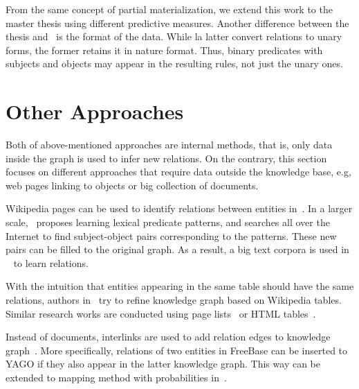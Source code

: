 From the same concept of partial materialization, we extend this work to the master thesis using different predictive measures. Another difference between the thesis and~\cite{ref12} is the format of the data. While la latter convert relations to unary forms, the former retains it in nature format. Thus, binary predicates with subjects and objects may appear in the resulting rules, not just the unary ones.

\section{Other Approaches}

Both of above-mentioned approaches are internal methods, that is, only data inside the graph is used to infer new relations. On the contrary, this section focuses on different approaches that require data outside the knowledge base, e.g, web pages linking to objects or big collection of documents.

Wikipedia pages can be used to identify relations between entities in~\cite{ref18}. In a larger scale,~\cite{ref19} proposes learning lexical predicate patterns, and searches all over the Internet to find subject-object pairs corresponding to the patterns. These new pairs can be filled to the original graph. As a result, a big text corpora is used in ~\cite{ref19} to learn relations.

With the intuition that entities appearing in the same table should have the same relations, authors in~\cite{ref20} try to refine knowledge graph based on Wikipedia tables. Similar research works are conducted using page lists~\cite{ref21} or HTML tables~\cite{ref22}.

Instead of documents, interlinks are used to add relation edges to knowledge graph~\cite{ref23, ref24}. More specifically, relations of two entities in FreeBase can be inserted to YAGO if they also appear in the latter knowledge graph. This way can be extended to mapping method with probabilities in~\cite{ref25}.